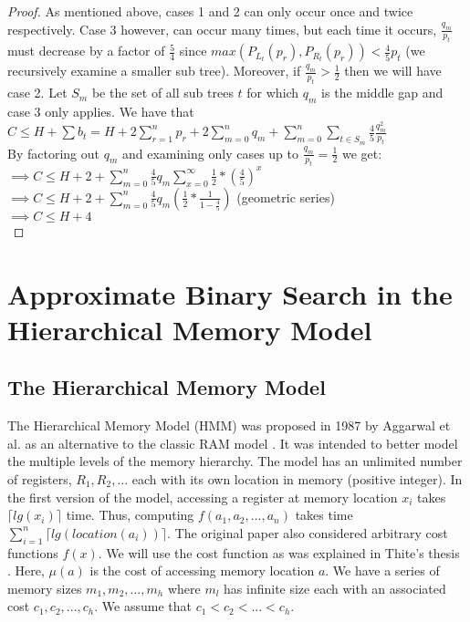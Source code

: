 \documentclass[letterpaper,12pt,titlepage,oneside,final]{book}
\theoremstyle{plain}
\begin{document}
\begin{proof}
As mentioned above, cases 1 and 2 can only occur once and twice respectively. Case 3 however, can occur many times, but each time it occurs, $\frac{q_m}{p_t}$ must decrease by a factor of $\frac{5}{4}$ since $max(P_{L_t}(p_r), P_{R_t}(p_r)) < \frac{4}{5} p_t$ (we recursively examine a smaller sub tree). Moreover, if $\frac{q_m}{p_t} > \frac{1}{2}$ then we will have case 2. Let $S_m$ be the set of all sub trees $t$ for which $q_m$ is the middle gap and case 3 only applies. We have that \\
$C \leq H + \sum b_t = H + 2 \sum\limits_{r = 1}^n p_r + 2 \sum\limits_{m = 0}^n q_m + \sum\limits_{m = 0}^n \sum\limits_{t \in S_m} \frac{4}{5}\frac{q_m^2}{p_t}$ \\ 
By factoring out $q_m$ and examining only cases up to $\frac{q_m}{p_t} = \frac{1}{2}$ we get: \\
$\implies C \leq H + 2 + \sum\limits_{m = 0}^n \frac{4}{5} q_m \sum\limits_{x=0}^{\infty} \frac{1}{2} * (\frac{4}{5}) ^ x$ \\
$\implies C \leq H + 2 + \sum\limits_{m = 0}^n \frac{4}{5}q_m (\frac{1}{2} * \frac{1}{1-\frac{4}{5}})$ (geometric series) \\
$\implies C \leq H + 4$ \\

\end{proof}

\chapter{Approximate Binary Search in the Hierarchical Memory Model} 
 
\section{The Hierarchical Memory Model}

The Hierarchical Memory Model (HMM) was proposed in 1987 by Aggarwal et al. as an alternative to the classic RAM model \cite{aggarwal1987model}. It was intended to better model the multiple levels of the memory hierarchy. The model has an unlimited number of registers, $R_1, R_2, ...$ each with its own location in memory (positive integer). In the first version of the model, accessing a register at memory location $x_i$ takes $\lceil lg(x_i) \rceil$ time. Thus, computing $f(a_1, a_2, ..., a_n)$ takes time $\sum_{i=1}^{n} \lceil lg(location(a_i)) \rceil$. The original paper also considered arbitrary cost functions $f(x)$. We will use the cost function as was explained in Thite's thesis \cite{thite2008optimum}. Here, $\mu (a)$ is the cost of accessing memory location $a$. We have a series of memory sizes $m_1, m_2, ..., m_h$ where $m_l$ has infinite size each with an associated cost $c_1, c_2, ..., c_h$. We assume that $c_1 < c_2 < ... < c_h$. 
\end{document}
